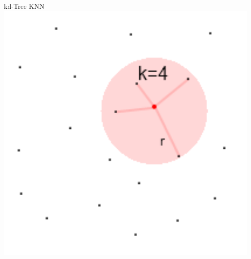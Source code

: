 \documentclass{beamer}
\begin{document}
\begin{frame}{kd-Tree KNN}
	\centering
	\includegraphics[height=0.7\textheight]{knn.png}
\end{frame}
\end{document}
